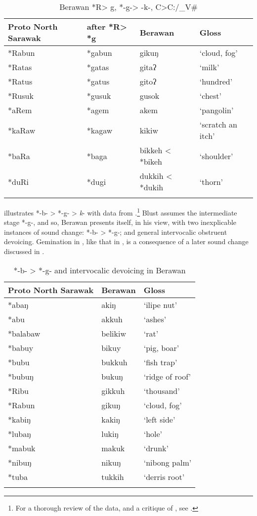 \documentclass[output=paper]{langscibook}
\begin{document}
\begin{table}
\begin{tabularx}{\textwidth}{lXll}
\lsptoprule
{Proto} {North} {Sarawak} & {after} *R> *g &   {Berawan} & {Gloss}\\
\midrule
*Rabun & *gabun & gikuŋ         & `cloud, fog'\\
*Ratas & *gatas & gitaʔ         & `milk'\\
*Ratus & *gatus & gitoʔ         & `hundred'\\
*Rusuk & *gusuk & gusok         & `chest'\\
*aRem & *agem & akem            & `pangolin'\\
*kaRaw & *kagaw & kikiw         & `scratch an itch'\\
*baRa & *baga & bikkeh < *bikeh & `shoulder'\\
*duRi & *dugi & dukkih < *dukih & `thorn'\\
\lspbottomrule
\end{tabularx}
\caption{\label{tab:blevins:5} Berawan *R> g, *-g-> -k-, C>C:/\_V\# \citep[667--668]{Blust2013}}
\end{table}

\largerpage[2]
 illustrates *-b- > *-g- > \textit{k}- with data from \citet[667--668]{Blust2013}.\footnote{For a thorough review of the data, and a critique of \citet{Beguš2019}, see .} Blust assumes the intermediate stage *-g-, and so, Berawan presents itself, in his view, with two inexplicable instances of sound change: *-b- > *-g-; and general intervocalic obstruent devoicing. Gemination in , like that in , is a consequence of a later sound change discussed in .
\clearpage

\begin{table}
\begin{tabularx}{\textwidth}{XXl}
\lsptoprule
{Proto} {North} {Sarawak} & {Berawan} & {Gloss}\\
\midrule
*abaŋ & akiŋ       & `ilipe nut'\\
*abu & akkuh       & `ashes'\\
*balabaw & belikiw & `rat'\\
*babuy & bikuy     & `pig, boar'\\
*bubu & bukkuh     & `fish trap'\\
*bubuŋ & bukuŋ     & `ridge of roof'\\
*Ribu & gikkuh     & `thousand'\\
*Rabun & gikuŋ     & `cloud, fog'\\
*kabiŋ & kakiŋ     & `left side'\\
*lubaŋ & lukiŋ     & `hole'\\
*mabuk & makuk     & `drunk'\\
*nibuŋ & nikuŋ     & `nibong palm'\\
*tuba & tukkih     & `derris root'\\
\lspbottomrule
\end{tabularx}
\caption{\label{tab:blevins:6}*-b- > *-g- and intervocalic devoicing in Berawan \citep[667--668]{Blust2013}}
\end{table}
\end{document}
